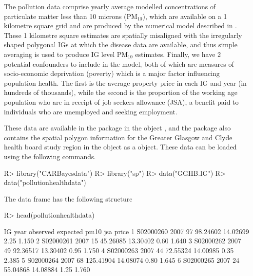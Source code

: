\documentclass[article, nojss]{jss}
\begin{document}
\hspace{1cm} The pollution data comprise yearly average modelled concentrations of particulate matter less than 10 microns (PM$_{10}$), which are available on a 1 kilometre square grid and are produced by the numerical  model described in \cite{ricardo2015}. These 1 kilometre square estimates are spatially misaligned with the irregularly shaped polygonal IGs at which the disease  data are available, and thus simple averaging is used to produce IG level PM$_{10}$ estimates. Finally, we have 2 potential confounders to include in the model, both of which are measures of socio-economic deprivation (poverty) which is a major factor influencing population health. The first is the average property price in each IG and year (in hundreds of thousands), while the second is the proportion of the working age population who are in receipt of job seekers allowance (JSA), a benefit paid to individuals who are unemployed and seeking employment.

\hspace{1cm} These data are available in the  package in the object , and the package also contains the spatial polygon information for the Greater Glasgow and Clyde health board study region in the object  as a  object. These data can be loaded using the following commands.




\begin{Schunk}
\begin{Sinput}
R>  library("CARBayesdata")
R>  library("sp")
R>  data("GGHB.IG")
R>  data("pollutionhealthdata")
\end{Sinput}
\end{Schunk}


The data frame  has the following structure

\begin{Schunk}
\begin{Sinput}
R>  head(pollutionhealthdata)
\end{Sinput}
\begin{Soutput}
         IG year observed  expected     pm10  jsa price
1 S02000260 2007       97  98.24602 14.02699 2.25 1.150
2 S02000261 2007       15  45.26085 13.30402 0.60 1.640
3 S02000262 2007       49  92.36517 13.30402 0.95 1.750
4 S02000263 2007       44  72.55324 14.00985 0.35 2.385
5 S02000264 2007       68 125.41904 14.08074 0.80 1.645
6 S02000265 2007       24  55.04868 14.08884 1.25 1.760
\end{Soutput}
\end{Schunk}
\end{document}
